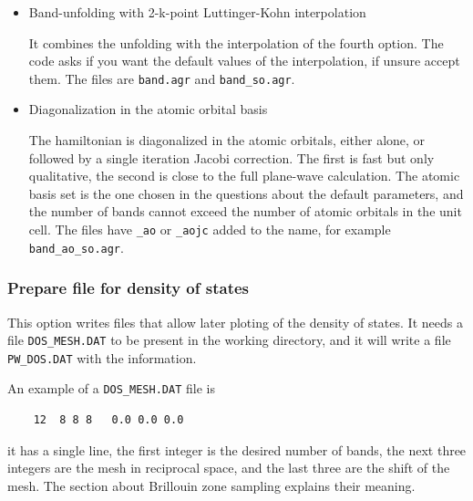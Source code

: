 \documentclass[11pt]{article}
\begin{document}
\begin{itemize}
   It is similar to the previous option, but it also calculates the projections of the
   states on the atomic orbitals, and writes them, with the unfolding weights, in the files
   \texttt{BAND.DAT} and \texttt{BAND\_SO.DAT}.  Those files are used by the graphical
   interfaces described in the Toolbox section.  The reference plots
   \texttt{band\_fld\_ref.agr} and \texttt{band\_fld\_ref\_so.agr} are also written.
   It needs atomic orbitals in the pseudopotential files.

   \item{Band-unfolding with 2-k-point Luttinger-Kohn interpolation}

   It combines the unfolding with the interpolation of the fourth option.  The code
   asks if you want the default values of the interpolation, if unsure accept them.
   The files are \texttt{band.agr} and \texttt{band\_so.agr}.

   \item{Diagonalization in the atomic orbital basis}

   The hamiltonian is diagonalized in the atomic orbitals, either alone, or followed
   by a single iteration Jacobi correction.  The first is fast but only qualitative,
   the second is close to the full plane-wave calculation.  The atomic basis set is the one
   chosen in the questions about the default parameters, and the number of bands
   cannot exceed the number of atomic orbitals in the unit cell.
   The files have \texttt{\_ao} or \texttt{\_aojc} added to the name, for example
   \texttt{band\_ao\_so.agr}.

\end{itemize}

\subsubsection{Prepare file for density of states}

This option writes files that allow later ploting of the density of states.
It needs a file \texttt{DOS\_MESH.DAT} to be present in the working directory,
and it will write a file \texttt{PW\_DOS.DAT} with the information.

An example of a \texttt{DOS\_MESH.DAT} file is
\begin{verbatim}
    12  8 8 8   0.0 0.0 0.0
\end{verbatim}
it has a single line, the first integer is the desired number of bands, the next three integers are
the mesh in reciprocal space, and the last three are the shift of the mesh.
The section about Brillouin zone sampling explains their meaning.
\end{document}
